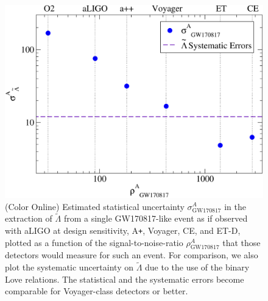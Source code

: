 \documentclass[prd,twocolumn,nofootinbib,superscriptaddress,amsmath,amssymb]{revtex4-1}
\begin{document}
\begin{figure}
\begin{center} 
\includegraphics[width=\columnwidth]{singleFisherLt.pdf}
\end{center}
\caption{(Color Online) Estimated statistical uncertainty $\sigma^A_{\text{GW170817}}$ in the extraction of $\tilde\Lambda$ from a single GW170817-like event as if observed with aLIGO at design sensitivity, A\texttt{+}, Voyager, CE, and ET-D, plotted as a function of the signal-to-noise-ratio $\rho^A_{\text{GW170817}}$ that those detectors would measure for such an event. For comparison, we also plot the systematic uncertainty on $\tilde\Lambda$ due to the use of the binary Love relations. The statistical and the systematic errors become comparable for Voyager-class detectors or better.
}
\label{fig:singleFisherLt}
\end{figure} 
\end{document}
